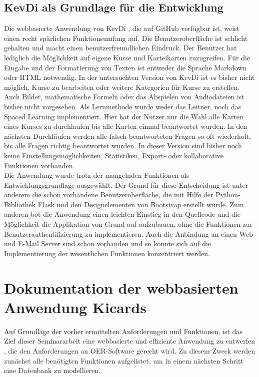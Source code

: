 \subsection{KevDi als Grundlage für die Entwicklung}
Die webbasierte Anwendung von KevDi \cite{kevdi}, die auf GitHub verfügbar ist, weist einen recht spärlichen Funktionsumfang auf. Die Benutzeroberfläche ist schlicht gehalten und macht einen benutzerfreundlichen Eindruck. Der Benutzer hat lediglich die Möglichkeit auf eigene Kurse und Karteikarten zuzugreifen. Für die Eingabe und der Formatierung von Texten ist entweder die Sprache Markdown oder HTML notwendig. In der untersuchten Version von KevDi ist es bisher nicht möglich, Kurse zu bearbeiten oder weitere Kategorien für Kurse zu erstellen. Auch Bilder, mathematische Formeln oder das Abspielen von Audiodateien ist bisher nicht vorgesehen. Als Lernmethode wurde weder das Leitner, noch das Spaced Learning implementiert. Hier hat der Nutzer nur die Wahl alle Karten eines Kurses zu durchlaufen bis alle Karten einmal beantwortet wurden. In den nächsten Durchläufen werden alle falsch beantworteten Fragen so oft wiederholt, bis alle Fragen richtig beantwortet wurden. In dieser Version sind bisher noch keine Einstellungsmöglichkeiten, Statistiken, Export- oder kollaborative Funktionen vorhanden. \\

Die Anwendung wurde trotz der mangelnden Funktionen als Entwicklungsgrundlage ausgewählt. Der Grund für diese Entscheidung ist unter anderem die schon vorhandene Benutzeroberfläche, die mit Hilfe der Python-Bibliothek Flask und den Designelementen von Bootstrap erstellt wurde. Zum anderen bot die Anwendung einen leichten Einstieg in den Quellcode und die Möglichkeit die Applikation von Grund auf aufzubauen, ohne die Funktionen zur Benutzerauthentifizierung zu implementieren. Auch die Anbindung an einen Web- und E-Mail Server sind schon vorhanden und so konnte sich auf die Implementierung der wesentlichen Funktionen konzentriert werden. \\



\section{Dokumentation der webbasierten Anwendung Kicards}
Auf Grundlage der vorher ermittelten Anforderungen und Funktionen, ist das Ziel dieser Seminararbeit eine webbasierte und effiziente Anwendung zu entwerfen \cite{kicards}, die den Anforderungen an OER-Software gerecht wird. Zu diesem Zweck werden zunächst alle benötigten Funktionen aufgelistet, um in einem nächsten Schritt eine Datenbank zu modellieren.

